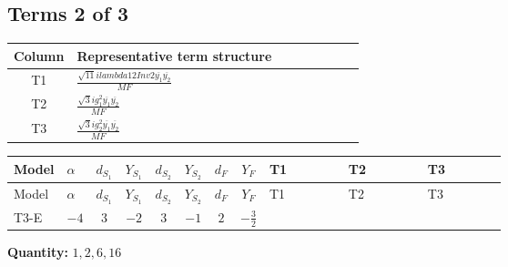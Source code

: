 \documentclass[8pt]{article}
\begin{document}
\begin{landscape}
\subsection*{Terms 2 of 3}
\begin{center}
\begin{tabular}{@{}c >{\raggedright\arraybackslash}p{0.82\linewidth}@{}}
\toprule
Column & Representative term structure \\
\midrule
T1 & \(\displaystyle \frac{\sqrt{11} i lambda12Inv2 \overline{y_{1}} \overline{y_{2}}}{MF}\) \\
\midrule
T2 & \(\displaystyle \frac{\sqrt{3} i g_{1}^{2} \overline{y_{1}} \overline{y_{2}}}{MF}\) \\
\midrule
T3 & \(\displaystyle \frac{\sqrt{3} i g_{2}^{2} \overline{y_{1}} \overline{y_{2}}}{MF}\) \\
\midrule
\bottomrule
\end{tabular}
\end{center}
\smallskip
\tiny
\begin{longtable}{@{}llcccccc >{\raggedright\arraybackslash}p{0.21\linewidth} >{\raggedright\arraybackslash}p{0.21\linewidth} >{\raggedright\arraybackslash}p{0.21\linewidth}@{}}
\toprule
Model & $\alpha$ & $d_{S_1}$ & $Y_{S_1}$ & $d_{S_2}$ & $Y_{S_2}$ & $d_F$ & $Y_F$ & T1 & T2 & T3 \\
\midrule
\endfirsthead
\toprule
Model & $\alpha$ & $d_{S_1}$ & $Y_{S_1}$ & $d_{S_2}$ & $Y_{S_2}$ & $d_F$ & $Y_F$ & T1 & T2 & T3 \\
\midrule
\endhead
T3-E & $-4$ & $3$ & $-2$ & $3$ & $-1$ & $2$ & $-\frac{3}{2}$ & \scriptsize\adjustbox{max width=\linewidth}{$\begin{gathered} \frac{3 \sqrt{11} i lambda12Inv2 \overline{y_{1}} \overline{y_{2}}}{22 MF}\end{gathered}$} & \scriptsize\adjustbox{max width=\linewidth}{$\begin{gathered} \frac{9 \sqrt{3} i g_{1}^{2} \overline{y_{1}} \overline{y_{2}}}{8 MF}\end{gathered}$} & \scriptsize\adjustbox{max width=\linewidth}{$\begin{gathered} \frac{15 \sqrt{3} i g_{2}^{2} \overline{y_{1}} \overline{y_{2}}}{8 MF}\end{gathered}$} \\
\midrule
\bottomrule
\end{longtable}
\clearpage
\noindent\textbf{Quantity: }$\mathrm{1,2,6,16}$\par\smallskip

\end{landscape}
\end{document}

